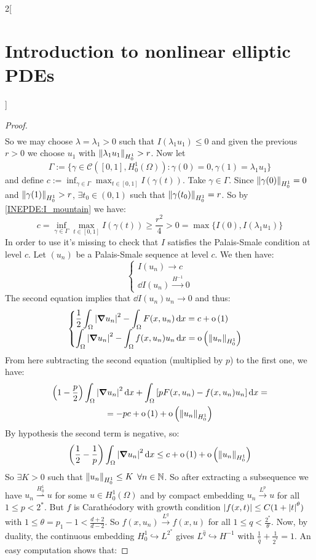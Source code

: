 \documentclass[../../../main_math.tex]{subfiles}
\begin{document}
\begin{multicols}{2}[\section{Introduction to nonlinear elliptic PDEs}]
\begin{proof}
\begin{multline*}
    \end{multline*}
    So we may choose $\lambda=\lambda_1>0$ such that $I(\lambda_1 u_1)\leq 0$ and given the previous $r>0$ we choose $u_1$ with $\left\|\lambda_1 u_1\right\|_{H_0^1}>r$. Now let
    $$
      \Gamma:=\{\gamma\in \mathcal{C}([0,1],H_0^1(\Omega)):\gamma(0)=0,\gamma(1)=\lambda_1 u_1\}
    $$
    and define $c:=\displaystyle \inf_{\gamma\in \Gamma}\max_{t\in [0,1]}I(\gamma(t))$. Take $\gamma\in \Gamma$. Since $\left\|\gamma(0)\right\|_{H_0^1}=0$ and $\left\|\gamma(1)\right\|_{H_0^1}> r$, $\exists t_0\in (0,1)$ such that $\left\|\gamma(t_0)\right\|_{H_0^1}=r$. So by \eqref{INEPDE:I_mountain} we have:
    $$
      c =\displaystyle \inf_{\gamma\in \Gamma}\max_{t\in [0,1]}I(\gamma(t))\geq \frac{r^2}{4}>0=\max\{I(0),I(\lambda_1 u_1)\}
    $$
    In order to use  it's missing to check that $I$ satisfies the Palais-Smale condition at level $c$. Let $(u_n)$ be a Palais-Smale sequence at level $c$. We then have:
    $$
      \begin{cases}
        I(u_n)\to c \\
        \dd{I(u_n)}\overset{H^{-1}}{\longrightarrow} 0
      \end{cases}$$
    The second equation implies that $\dd{I(u_n)}u_n\to 0$ and thus:
    $$
      \begin{cases}
        \displaystyle\frac{1}{2}\int_\Omega \abs{\grad u_n}^2-\int_\Omega F(x,u_n)\dd{x}=c+\mathrm{o}\left(1\right) \\
        \displaystyle\int_\Omega \abs{\grad u_n}^2-\int_\Omega f(x,u_n)u_n\dd{x}=\mathrm{o}\left(\left\|u_n\right\|_{H_0^1}\right)
      \end{cases}
    $$
    From here subtracting the second equation (multiplied by $p$) to the first one, we have:
    \begin{multline*}
      \left(1-\frac{p}{2}\right)\int_\Omega \abs{\grad u_n}^2\dd{x}+\int_\Omega \left[pF(x,u_n)-f(x,u_n)u_n\right]\dd{x}=\\
      =-pc+\mathrm{o}\left(1\right) + \mathrm{o}\left(\left\|u_n\right\|_{H_0^1}\right)
    \end{multline*}
    By hypothesis the second term is negative, so:
    $$
      \left(\frac{1}{2}- \frac{1}{p}\right)\int_\Omega \abs{\grad u_n}^2\dd{x}\leq c + \mathrm{o}\left(1\right) + \mathrm{o}\left(\left\|u_n\right\|_{H_0^1}\right)
    $$
    So $\exists K>0$ such that $\left\|u_n\right\|_{H_0^1}\leq K$ $\forall n\in\mathbb{N}$. So after extracting a subsequence we have $u_n\overset{H_0^1}{\rightharpoonup} u$ for some $u\in H_0^1(\Omega)$ and by compact embedding $u_n\overset{L^p}{\longrightarrow} u$ for all $1\leq p<2^*$. But $f$ is Carathéodory with growth condition $\abs{f(x,t)}\leq C(1+\abs{t}^{\theta})$ with $1\leq \theta =p_1-1<\frac{d+2}{d-2}$. So $f(x,u_n)\overset{L^q}{\longrightarrow} f(x,u)$ for all $1\leq q<\frac{2^*}{\theta}$. Now, by duality, the continuous embedding $H_0^1\hookrightarrow L^{2^*}$ gives $L^{\hat{q}} \hookrightarrow H^{-1}$ with $\frac{1}{\hat{q}}+\frac{1}{2^*}=1$. An easy computation shows that:

\end{proof}
\end{multicols}
\end{document}
